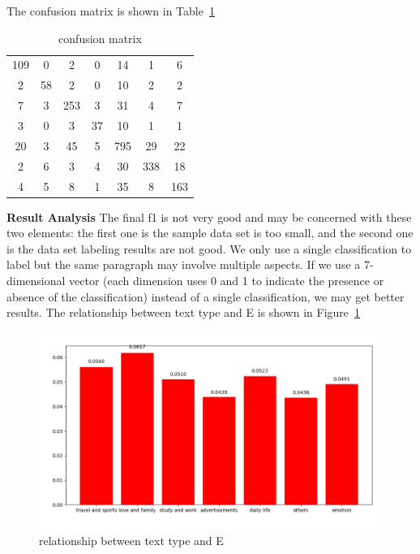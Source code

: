 \documentclass[10pt,twocolumn,letterpaper]{article}
\begin{document}
    \setlength{\tabcolsep}{1.4pt}
    The confusion matrix is shown in Table~\ref{matrix}
    \begin{table}
    \newcommand{\tabincell}[2]{\begin{tabular}{@{}#1@{}}#2\end{tabular}}
    \begin{center}
    \caption{confusion matrix}
    \vspace{0.5cm}
    \label{matrix}
    \begin{tabular}{ccccccc}
    109&0&2&0&14&1&6\\
    2&58&2&0&10&2&2\\
    7&3&253&3&31&4&7\\
    3&0&3&37&10&1&1\\
    20&3&45&5&795&29&22\\
    2&6&3&4&30&338&18\\
    4&5&8&1&35&8&163\\
    \end{tabular}
    \end{center}
    \end{table}
    \setlength{\tabcolsep}{1.4pt}

    \textbf{Result Analysis}
    The final f1 is not very good and may be concerned with these two elements: the first one is the sample data set is too small, and the second one is the data set labeling results are not good.
    We only use a single classification to label but the same paragraph may involve multiple aspects.
    If we use a 7-dimensional vector (each dimension uses 0 and 1 to indicate the presence or absence of the classification) instead of a single classification, we may get better results.
    The relationship between text type and E is shown in Figure~\ref{fig:e4}
    \begin{figure}[t]
    \begin{center}
    \includegraphics[width=\linewidth]{e4}
    \end{center}
    \vspace{-0.5cm}
       \caption{relationship between text type and E}
       \label{fig:e4}
    \end{figure}
\end{document}
